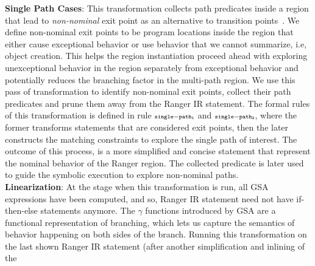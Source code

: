\textbf{Single Path Cases}: This transformation collects path predicates inside a region that lead to
\textit{non-nominal} exit point as an alternative to transition points~\cite{veritesting}.
%
We define non-nominal exit points to be program locations inside the region that either cause
exceptional behavior or use behavior that we cannot summarize, i.e, object creation.
%
This helps the region instantiation proceed ahead with exploring unexceptional behavior in the region separately from
exceptional behavior and potentially reduces the branching factor in the multi-path region.
%
%
We use this pass of transformation to identify non-nominal exit points, collect their path predicates and prune them away from the
Ranger IR statement. The formal rules of this transformation is defined in rule $\scriptstyle\mathtt{single-path_1}$ and
$\scriptstyle\mathtt{single-path_2}$, where the former transforms statements that are considered exit points, then the later constructs
the matching constraints to explore the single path of interest.
%
The outcome of this process, is a more simplified and concise statement that represent the nominal behavior of the Ranger region.
%
The collected predicate is later used to guide the symbolic execution to explore non-nominal paths.\\
%
\textbf{Linearization}:
At the stage when this transformation is run, all GSA expressions have been computed, and so, Ranger IR statement
need not have if-then-else statements anymore.
%
The $\gamma$ functions introduced by GSA are a functional representation of branching, which lets us
capture the semantics of behavior happening on both sides of the branch.
%
Running this transformation on the last shown Ranger IR statement (after another simplification and inlining of the
